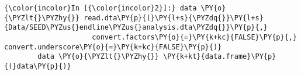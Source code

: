    \begin{Verbatim}[commandchars=\\\{\}]
{\color{incolor}In [{\color{incolor}2}]:} data \PY{o}{\PYZlt{}\PYZhy{}} read.dta\PY{p}{(}\PY{l+s}{\PYZdq{}}\PY{l+s}{Data/SEED\PYZus{}endline\PYZus{}analysis.dta\PYZdq{}}\PY{p}{,}
                     convert.factors\PY{o}{=}\PY{k+kc}{FALSE}\PY{p}{,} convert.underscore\PY{o}{=}\PY{k+kc}{FALSE}\PY{p}{)}
        data \PY{o}{\PYZlt{}\PYZhy{}} \PY{k+kt}{data.frame}\PY{p}{(}data\PY{p}{)}
\end{Verbatim}

